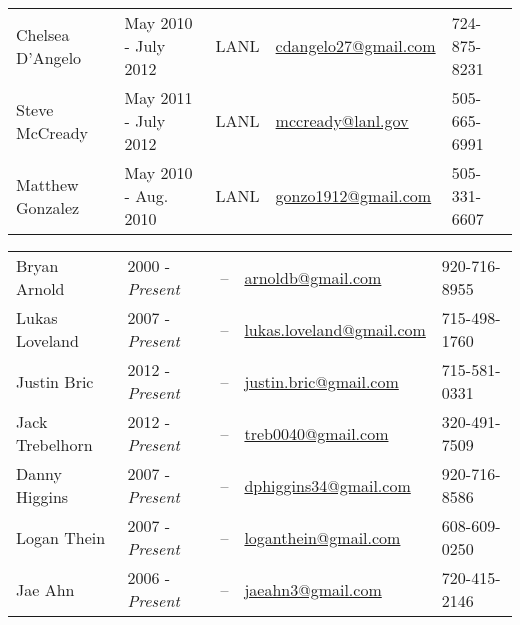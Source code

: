\begin{center}
\begin{minipage}{\textwidth}
\begin{tabular}{lllll}
{Chelsea D'Angelo}\label{chelsea_dangelo} & {May 2010 - July 2012} & {LANL}& \href{mailto:cdangelo27@gmail.com}{cdangelo27@gmail.com} & 724-875-8231\\ %

{Steve McCready} \label{steve_mccready}& {May 2011 - July 2012} &{LANL} & \href{mailto:mccready@lanl.gov}{mccready@lanl.gov} & 505-665-6991\\ %

{Matthew Gonzalez}\label{matt_gonzo} & {May 2010 - Aug. 2010} & {LANL} & \href{mailto:gonzo1912@gmail.com}{gonzo1912@gmail.com} & 505-331-6607\\ %

\end{tabular}
\end{minipage}
\end{center}

\begin{center}
\begin{minipage}{\textwidth}
\begin{tabular}{lllll}

Bryan Arnold & {2000 - \emph{Present}} & -- &  \href{mailto:arnoldb@gmail.com}{arnoldb@gmail.com} &   920-716-8955\\ %

Lukas Loveland & 2007 - \emph{Present} & -- &  \href{mailto:lukas.loveland@gmail.com}{lukas.loveland@gmail.com} &   715-498-1760\\ %

Justin Bric & 2012 - \emph{Present}& -- & \href{mailto:justin.bric@gmail.com}{justin.bric@gmail.com} &  715-581-0331 \\ %
	
Jack Trebelhorn & 2012 - \emph{Present} & -- & \href{mailto:treb0040@gmail.com}{treb0040@gmail.com} &   320-491-7509 \\ %

Danny Higgins & 2007 - \emph{Present} & -- & \href{mailto:dphiggins34@gmail.com}{dphiggins34@gmail.com} & 920-716-8586 \\ %

Logan Thein & 2007 - \emph{Present} & -- & \href{mailto:loganthein@gmail.com}{loganthein@gmail.com}  &   608-609-0250  \\ %

Jae Ahn & 2006 - \emph{Present} & -- & \href{mailto:jaeahn3@gmail.com}{jaeahn3@gmail.com} &   720-415-2146\\ %

\end{tabular}
\end{minipage}
\end{center}

